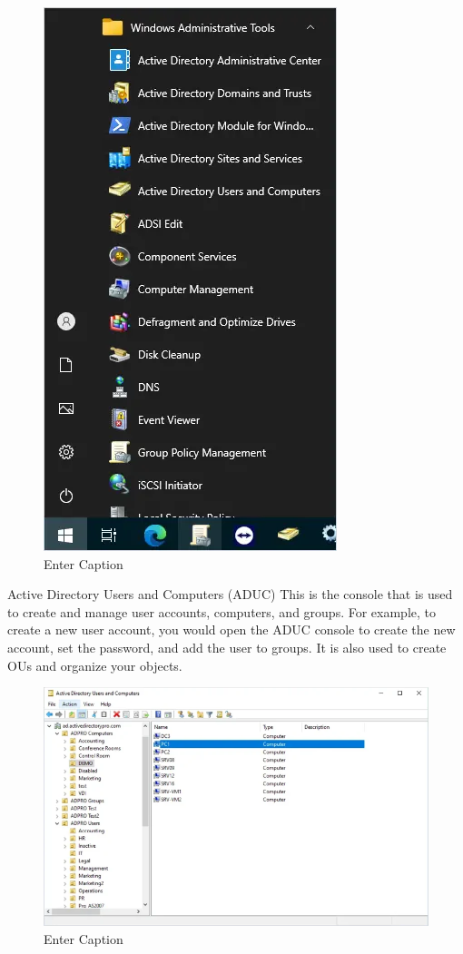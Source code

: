 \begin{figure}
    \centering
    \includegraphics[width=0.75\linewidth]{rsat.png}
    \caption{Enter Caption}
    \label{fig:placeholder}
\end{figure}

Active Directory Users and Computers (ADUC)
This is the console that is used to create and manage user accounts, computers, and groups. For example, to create a new user account, you would open the ADUC console to create the new account, set the password, and add the user to groups. It is also used to create OUs and organize your objects.

\begin{figure}
    \centering
    \includegraphics[width=0.75\linewidth]{aduc.png}
    \caption{Enter Caption}
    \label{fig:placeholder}
\end{figure}

